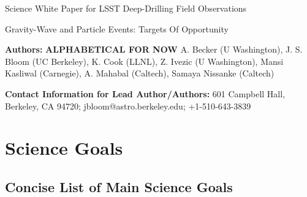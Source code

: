 \documentclass [11pt]{article}
\begin{document}

\centerline {\Large Science White Paper for LSST Deep-Drilling Field Observations}

\vspace*{0.2 cm}


%

\centerline {\Large Gravity-Wave and Particle Events: Targets Of Opportunity}

\vspace*{0.4 cm}

\noindent 
{\bf Authors:} {\bf ALPHABETICAL FOR NOW} A. Becker (U Washington),  J. S. Bloom (UC Berkeley), K. Cook (LLNL), Z. Ivezic (U Washington), Mansi Kasliwal (Carnegie), A. Mahabal (Caltech), Samaya Nissanke (Caltech) 


\vspace*{0.2 cm}

\noindent 
{\bf Contact Information for Lead Author/Authors:} 601 Campbell Hall, Berkeley, CA 94720; jbloom@astro.berkeley.edu; +1-510-643-3839

\vspace*{0.2 cm}


\section{Science Goals}


\subsection{Concise List of Main Science Goals}

\end{document}
